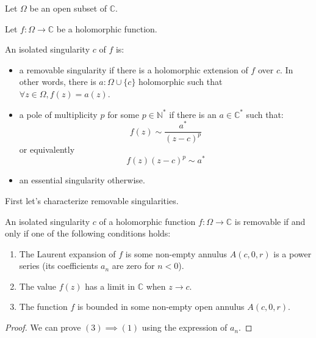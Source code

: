 \begin{defi}

    Let $\Omega$ be an open subset of $\mathbb{C}$.

    Let $f: \Omega \rightarrow \mathbb{C}$ be a holomorphic function.

    An isolated singularity $c$ of $f$ is:

    \begin{itemize}
        \item a removable singularity if there is a holomorphic extension of $f$ over $c$. In other words, there is $a: \Omega\cup\lbrace c \rbrace$ holomorphic such that $\forall z \in\Omega, f(z) = a(z) $.
        \item a pole of multiplicity $p$ for some $p \in \mathbb{N}^*$ if there is an $a\in \mathbb{C}^*$ such that:
            $$ f(z) \sim \frac{a^*}{(z-c)^p}$$ or equivalently $$f(z)(z-c)^p \sim a^*$$
        \item an essential singularity otherwise.
    \end{itemize}
\end{defi}

First let's characterize removable singularities.

\begin{thm*}

    An isolated singularity $c$ of a holomorphic function $f: \Omega \rightarrow \mathbb{C}$ is removable if and only if one of the following conditions holds:

    \begin{enumerate}
        \item The Laurent expansion of $f$ is some non-empty annulus $A(c, 0, r)$ is a power series (its coefficients $a_n$ are zero for $n<0$).
        \item The value $f(z)$ has a limit in $\mathbb{C}$ when $z\rightarrow c$.
        \item The function $f$ is bounded in some non-empty open annulus $A(c, 0, r)$.
    \end{enumerate}
\end{thm*}

\begin{proof}
    We can prove $ (3) \implies (1)$ using the expression of $a_n$.
\end{proof}

